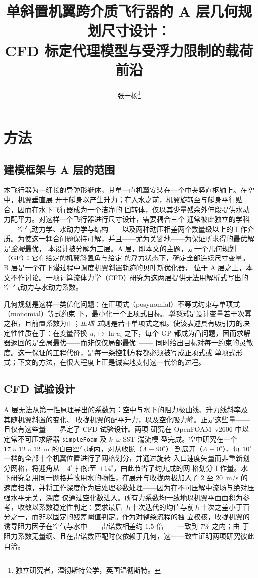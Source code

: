\documentclass[a4paper,10pt,twocolumn]{ctexart}
\title{单斜置机翼跨介质飞行器的 A 层几何规划尺寸设计：\\CFD 标定代理模型与受浮力限制的载荷前沿}
\author{张一杨\thanks{独立研究者，温彻斯特公学，英国温彻斯特。}}
\date{}
\begin{document}
\maketitle

\section{方法}

\subsection{建模框架与 A 层的范围}
本飞行器为一细长的导弹形艇体，其单一直机翼安装在一个中央竖直枢轴上。在空中，机翼垂直展
开于艇身以产生升力；在入水之前，机翼旋转至与艇身平行贴合，因而在水下飞行器成为一个洁净的
回转体，仅以其少量残余外伸段提供水动力配平力。对这样一个飞行器进行尺寸设计，需要耦合三个
通常彼此独立的学科——空气动力学、水动力学与结构——以及两种动压相差两个数量级以上的工作介
质。为使这一耦合问题保持可解，并且——尤为关键地——为保证所求得的最优解是\emph{全局}最优，
本设计被分解为三层。A 层，即本文的主题，是一个几何规划（GP）：它在给定的机翼斜置角与给定
的浮力状态下，确定全部连续尺寸变量。B 层是一个在下潜过程中调度机翼斜置轨迹的贝叶斯优化器，
位于 A 层之上，本文不作讨论。一项计算流体力学（CFD）研究为这两层提供无法用解析式写出的空
气动力与水动力系数。

几何规划是这样一类优化问题：在正项式（posynomial）不等式约束与单项式（monomial）等式约束
下，最小化一个正项式目标。\emph{单项式}是设计变量若干次幂之积，且前置系数为正；\emph{正项
式}则是若干单项式之和。使该表述具有吸引力的决定性性质在于：在变量替换 $u_i\mapsto\ln u_i$
之下，每个 GP 都成为凸问题，因而求解器返回的是全局最优——而非仅仅局部最优~\cite{boyd2007tutorial}——
同时给出目标对每一约束的灵敏度。这一保证的工程代价，是每一条控制方程都必须被写成正项式或
单项式形式；下文的方法，在很大程度上正是诚实地支付这一代价的过程。

\subsection{CFD 试验设计}
A 层无法从第一性原理导出的系数为：空中与水下的阻力极曲线、升力线斜率及其随机翼斜置的变化、
收拢机翼的配平升力，以及空化吸力峰。正是这些量——且仅有这些量——界定了 CFD 试验设计。两项
研究在 OpenFOAM~v2606 中以定常不可压求解器 \texttt{simpleFoam} 及 $k$--$\omega$ SST 湍流模
型完成。空中研究在一个 $17\times12\times12$~m 的自由空气域内，对从收拢（$\Lambda=90^\circ$）
到展开（$\Lambda=0^\circ$）、每 $10^\circ$ 一档的全部十个机翼位置进行了网格划分，并通过旋转
入口速度矢量而非重新划分网格，将迎角从 $-4^\circ$ 扫掠至 $+14^\circ$，由此节省了约九成的网
格划分工作量。水下研究复用同一网格并改用水的物性，在展开与收拢两极加入了 $2$ 至 $20$~m/s
的速度扫掠，并将工作深度作为后处理参数处理——因为在不可压解中流场与绝对压强水平无关，深度
仅通过空化数进入。所有力系数均一致地以机翼平面面积为参考，收敛以系数稳定性判定：要求最后
五十次迭代的均值与前五十次之差小于百分之一，而非以固定的残差阈值判定。作为对整条流程的独
立校核，收拢机翼的诱导阻力因子在空气与水中——雷诺数相差约 $1.5$ 倍——一致到 $7\%$ 之内；由
于阻力系数无量纲、且在雷诺数匹配时仅依赖于几何，这一一致性证明两项研究彼此自洽。
\end{document}
